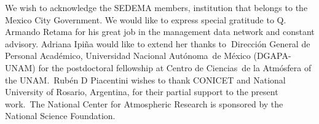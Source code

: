 \documentclass{article}
\begin{document}
{\label{667124}}

We wish to acknowledge the SEDEMA members, institution that belongs to
the Mexico City Government. We would like to express special gratitude
to Q. Armando Retama for his great job in the management data network
and constant advisory. Adriana Ipiña would like to extend her thanks
to\textbf{~}Dirección General de Personal Académico, Universidad
Nacional Autónoma~de México (DGAPA-UNAM) for the postdoctoral fellowship
at Centro de Ciencias~de la Atmósfera of the UNAM.~Rubén D Piacentini
wishes to thank CONICET and National University of Rosario, Argentina,
for their partial support to the present work.~The National Center for
Atmospheric Research is sponsored by the National Science Foundation.


\end{document}
